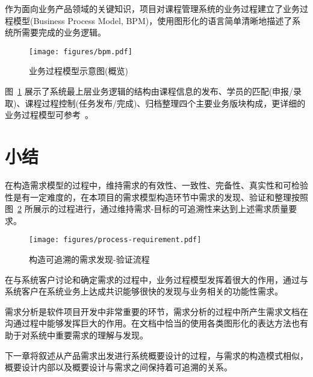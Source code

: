 作为面向业务产品领域的关键知识，项目对课程管理系统的业务过程建立了业务过程模型(Business Process Model, BPM)，使用图形化的语言简单清晰地描述了系统所需要完成的业务逻辑。

\begin{figure}[!h]
  \begin{center}
    \texttt{[image: figures/bpm.pdf]}
    \caption{业务过程模型示意图(概览)\label{BPMOverview}}
  \end{center}
\end{figure}

图~\ref{BPMOverview} 展示了系统最上层业务逻辑的结构由课程信息的发布、学员的匹配(申报/录取)、课程过程控制(任务发布/完成)、归档整理四个主要业务版块构成，更详细的业务过程模型可参考~。

\section{小结}

在构造需求模型的过程中，维持需求的有效性、一致性、完备性、真实性和可检验性是有一定难度的，在本项目的需求模型构造环节中需求的发现、验证和整理按照图~\ref{RequirementExtraction} 所展示的过程进行，通过维持需求-目标的可追溯性来达到上述需求质量要求。

\begin{figure}[!h]
  \begin{center}
    \texttt{[image: figures/process-requirement.pdf]}
    \caption{构造可追溯的需求发现-验证流程\label{RequirementExtraction}}
  \end{center}
\end{figure}

在与系统客户讨论和确定需求的过程中，业务过程模型发挥着很大的作用，通过与系统客户在系统业务上达成共识能够很快的发现与业务相关的功能性需求。

需求分析是软件项目开发中非常重要的环节，需求分析的过程中所产生需求文档在沟通过程中能够发挥巨大的作用。在文档中恰当的使用各类图形化的表达方法也有助于对系统中重要需求的理解与发现。

下一章将叙述从产品需求出发进行系统概要设计的过程，与需求的构造模式相似，概要设计内部以及概要设计与需求之间保持着可追溯的关系。

